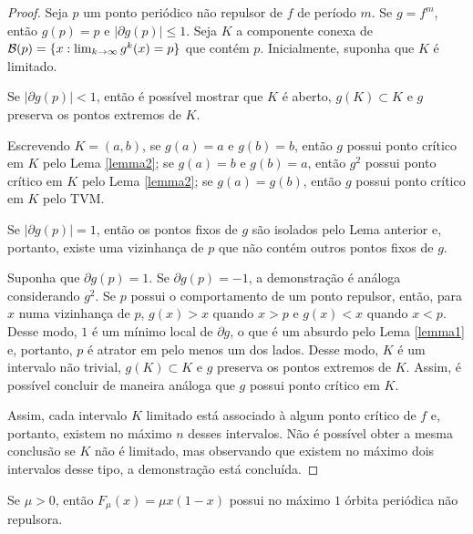 \begin{proof}
Seja $p$ um ponto periódico não repulsor de $f$ de período $m$.
Se $g = f^m$, então $g(p) = p$ e $|\partial g(p)| \leq 1$.
Seja $K$ a componente conexa de $\mathcal{B}(p) = \lbrace x : \lim_{k \to \infty} g^k(x) = p \rbrace$ que contém $p$.
Inicialmente, suponha que $K$ é limitado.

Se $|\partial g(p)| < 1$, então é possível mostrar que $K$ é aberto, $g(K) \subset K$ e $g$ preserva os pontos extremos de $K$.

Escrevendo $K = (a, b)$, se $g(a) = a$ e $g(b) = b$, então $g$ possui ponto crítico em $K$ pelo Lema \ref{lemma2}; se $g(a) = b$ e $g(b) = a$, então $g^2$ possui ponto crítico em $K$ pelo Lema \ref{lemma2}; se $g(a) = g(b)$, então $g$ possui ponto crítico em $K$ pelo TVM.

Se $|\partial g(p)| = 1$, então os pontos fixos de $g$ são isolados pelo Lema anterior e, portanto, existe uma vizinhança de $p$ que não contém outros pontos fixos de $g$.

Suponha que $\partial g(p) = 1$.
Se $\partial g(p) = -1$, a demonstração é análoga considerando $g^2$.
Se $p$ possui o comportamento de um ponto repulsor, então, para $x$ numa vizinhança de $p$, $g(x) > x$ quando $x > p$ e $g(x) < x$ quando $x < p$.
Desse modo, $1$ é um mínimo local de $\partial g$, o que é um absurdo pelo Lema \ref{lemma1} e, portanto, $p$ é atrator em pelo menos um dos lados.
Desse modo, $K$ é um intervalo não trivial, $g(K) \subset K$ e $g$ preserva os pontos extremos de $K$.
Assim, é possível concluir de maneira análoga que $g$ possui ponto crítico em $K$.

Assim, cada intervalo $K$ limitado está associado à algum ponto crítico de $f$ e, portanto, existem no máximo $n$ desses intervalos.
Não é possível obter a mesma conclusão se $K$ não é limitado, mas observando que existem no máximo dois intervalos desse tipo, a demonstração está concluída.
\end{proof}

\begin{corollary}
Se $\mu > 0$, então $F_\mu(x) = \mu x(1-x)$ possui no máximo $1$ órbita periódica não repulsora.
\end{corollary}
